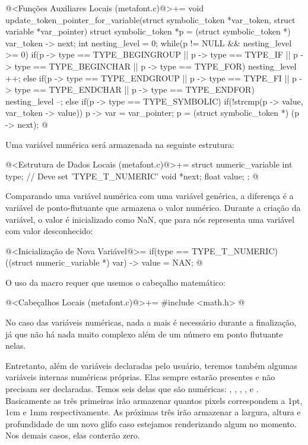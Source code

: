 \iniciocodigo
@<Funções Auxiliares Locais (metafont.c)@>+=
void update_token_pointer_for_variable(struct symbolic_token *var_token,
                                      struct variable *var_pointer){
  struct symbolic_token *p = (struct symbolic_token *) var_token -> next;
  int nesting_level = 0;
  while(p != NULL && nesting_level >= 0){
    if(p -> type == TYPE_BEGINGROUP || p -> type == TYPE_IF ||
       p -> type == TYPE_BEGINCHAR || p -> type == TYPE_FOR)
      nesting_level ++;
    else if(p -> type == TYPE_ENDGROUP || p -> type == TYPE_FI ||
            p -> type == TYPE_ENDCHAR || p -> type == TYPE_ENDFOR)
      nesting_level --;
    else if(p -> type == TYPE_SYMBOLIC){
      if(!strcmp(p -> value, var_token -> value)){
        p -> var = var_pointer;
      }
    }
    p = (struct symbolic_token *) (p -> next);
  }
}
@
\fimcodigo


Uma variável numérica será armazenada na seguinte estrutura:

\iniciocodigo
@<Estrutura de Dados Locais (metafont.c)@>+=
struct numeric_variable{
  int type; // Deve set 'TYPE_T_NUMERIC'
  void *next;
  float value;
};
@
\fimcodigo

Comparando uma variável numérica com uma variável genérica, a
diferença é a variável de ponto-flutuante  que
armazena o valor numérico. Durante a criação da variável, o valor é
inicializado como NaN, que para nós representa uma variável com valor
desconhecido:

\iniciocodigo
@<Inicialização de Nova Variável@>=
if(type == TYPE_T_NUMERIC){
  ((struct numeric_variable *) var) -> value = NAN;
}
@
\fimcodigo

O uso da macro  requer que usemos o cabeçalho
matemático:

\iniciocodigo
@<Cabeçalhos Locais (metafont.c)@>+=
#include <math.h>
@
\fimcodigo

No caso das variáveis numéricas, nada a mais é necessário durante a
finalização, já que não há nada muito complexo além de um número em
ponto flutuante nelas.

Entretanto, além de variáveis declaradas pelo usuário, teremos também
algumas variáveis internas numéricas próprias. Elas sempre estarão
presentes e não precisam ser declaradas. Temos seis delas que são
numéricas: , , , ,
 e . Basicamente as três primeiras
irão armazenar quantos pixels correspondem a 1pt, 1cm e 1mm
respectivamente. As próximas três irão armazenar a largura, altura e
profundidade de um novo glifo caso estejamos renderizando algum no
momento. Nos demais casos, elas conterão zero.

